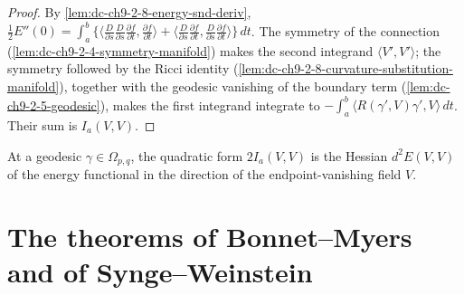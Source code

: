 \begin{proof}

  \sketch
  By \cref{lem:dc-ch9-2-8-energy-snd-deriv},
  $\frac12 E''(0)=\int_a^b\{\langle\frac{D}{\partial s}\frac{D}{\partial s}\frac{\partial f}{\partial t},\frac{\partial f}{\partial t}\rangle+\langle\frac{D}{\partial s}\frac{\partial f}{\partial t},\frac{D}{\partial s}\frac{\partial f}{\partial t}\rangle\}\,dt$.
  The symmetry of the connection (\cref{lem:dc-ch9-2-4-symmetry-manifold}) makes the second
  integrand $\langle V',V'\rangle$; the symmetry followed by the Ricci identity
  (\cref{lem:dc-ch9-2-8-curvature-substitution-manifold}), together with the geodesic
  vanishing of the boundary term (\cref{lem:dc-ch9-2-5-geodesic}), makes the first integrand
  integrate to $-\int_a^b\langle R(\gamma',V)\gamma',V\rangle\,dt$. Their sum is $I_a(V,V)$.

\end{proof}
\begin{remark}
  \label{rem:dc-ch9-2-12}
  At a geodesic $\gamma\in\Omega_{p,q}$, the quadratic form
  $2I_a(V,V)$ is the Hessian $d^2E(V,V)$ of the energy functional in the
  direction of the endpoint-vanishing field $V$.
\end{remark}
\section{The theorems of Bonnet--Myers and of Synge--Weinstein}

